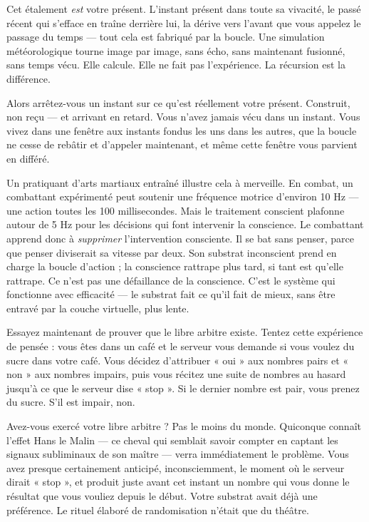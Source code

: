 \documentclass[11pt, twoside, openright]{book}
\begin{document}
Cet étalement \textit{est} votre présent. L'instant présent dans toute sa vivacité, le passé récent qui s'efface en traîne derrière lui, la dérive vers l'avant que vous appelez le passage du temps --- tout cela est fabriqué par la boucle. Une simulation météorologique tourne image par image, sans écho, sans maintenant fusionné, sans temps vécu. Elle calcule. Elle ne fait pas l'expérience. La récursion est la différence.

Alors arrêtez-vous un instant sur ce qu'est réellement votre présent. Construit, non reçu --- et arrivant en retard. Vous n'avez jamais vécu dans un instant. Vous vivez dans une fenêtre aux instants fondus les uns dans les autres, que la boucle ne cesse de rebâtir et d'appeler maintenant, et même cette fenêtre vous parvient en différé.

Un pratiquant d'arts martiaux entraîné illustre cela à merveille. En combat, un combattant expérimenté peut soutenir une fréquence motrice d'environ 10 Hz --- une action toutes les 100 millisecondes. Mais le traitement conscient plafonne autour de 5 Hz pour les décisions qui font intervenir la conscience. Le combattant apprend donc à \textit{supprimer} l'intervention consciente. Il se bat sans penser, parce que penser diviserait sa vitesse par deux. Son substrat inconscient prend en charge la boucle d'action ; la conscience rattrape plus tard, si tant est qu'elle rattrape. Ce n'est pas une défaillance de la conscience. C'est le système qui fonctionne avec efficacité --- le substrat fait ce qu'il fait de mieux, sans être entravé par la couche virtuelle, plus lente.

Essayez maintenant de prouver que le libre arbitre existe. Tentez cette expérience de pensée : vous êtes dans un café et le serveur vous demande si vous voulez du sucre dans votre café. Vous décidez d'attribuer « oui » aux nombres pairs et « non » aux nombres impairs, puis vous récitez une suite de nombres au hasard jusqu'à ce que le serveur dise « stop ». Si le dernier nombre est pair, vous prenez du sucre. S'il est impair, non.

Avez-vous exercé votre libre arbitre ? Pas le moins du monde. Quiconque connaît l'effet Hans le Malin --- ce cheval qui semblait savoir compter en captant les signaux subliminaux de son maître --- verra immédiatement le problème. Vous avez presque certainement anticipé, inconsciemment, le moment où le serveur dirait « stop », et produit juste avant cet instant un nombre qui vous donne le résultat que vous vouliez depuis le début. Votre substrat avait déjà une préférence. Le rituel élaboré de randomisation n'était que du théâtre.
\end{document}
